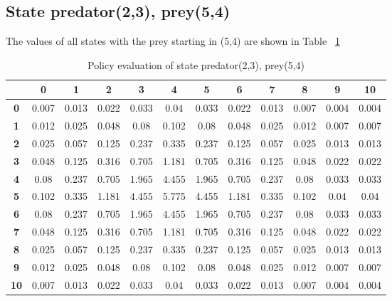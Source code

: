 \documentclass[11pt]{article}
\begin{document}
\subsection{State predator(2,3), prey(5,4)}

The values of all states with the prey starting in (5,4) are shown in Table ~\ref{state2}

\begin{center}
\begin{table}[ht]
{\small
\hfill{}
\begin{tabular}{c|c|c|c|c|c|c|c|c|c|c|c}
\textbf{} & \textbf{0} & \textbf{1} & \textbf{2} & \textbf{3} & \textbf{4} & \textbf{5} & \textbf{6} & \textbf{7} & \textbf{8} & \textbf{9} & \textbf{10}\\
	\hline
	\textbf{0}& 0.007	& 0.013	& 0.022	& 0.033	& 0.04	& 0.033	& 0.022	& 0.013	& 0.007	& 0.004	& 0.004	\\
	\textbf{1}& 0.012	& 0.025	& 0.048	& 0.08	& 0.102	& 0.08	& 0.048	& 0.025	& 0.012	& 0.007	& 0.007	\\
	\textbf{2}& 0.025	& 0.057	& 0.125	& 0.237	& 0.335	& 0.237	& 0.125	& 0.057	& 0.025	& 0.013	& 0.013	\\
	\textbf{3}& 0.048	& 0.125	& 0.316	& 0.705	& 1.181	& 0.705	& 0.316	& 0.125	& 0.048	& 0.022	& 0.022	\\
	\textbf{4}& 0.08	& 0.237	& 0.705	& 1.965	& 4.455	& 1.965	& 0.705	& 0.237	& 0.08	& 0.033	& 0.033	\\
	\textbf{5}& 0.102	& 0.335	& 1.181	& 4.455	& 5.775	& 4.455	& 1.181	& 0.335	& 0.102	& 0.04	& 0.04	\\
	\textbf{6}& 0.08	& 0.237	& 0.705	& 1.965	& 4.455	& 1.965	& 0.705	& 0.237	& 0.08	& 0.033	& 0.033	\\
	\textbf{7}& 0.048	& 0.125	& 0.316	& 0.705	& 1.181	& 0.705	& 0.316	& 0.125	& 0.048	& 0.022	& 0.022	\\
	\textbf{8}& 0.025	& 0.057	& 0.125	& 0.237	& 0.335	& 0.237	& 0.125	& 0.057	& 0.025	& 0.013	& 0.013	\\
	\textbf{9}& 0.012	& 0.025	& 0.048	& 0.08	& 0.102	& 0.08	& 0.048	& 0.025	& 0.012	& 0.007	& 0.007	\\
	\textbf{10}& 0.007	& 0.013	& 0.022	& 0.033	& 0.04	& 0.033	& 0.022	& 0.013	& 0.007	& 0.004	& 0.004	\\
\end{tabular}}
\hfill{}
\caption{Policy evaluation of state predator(2,3), prey(5,4)}
\label{state2}
\end{table}
\end{center}
\end{document}
